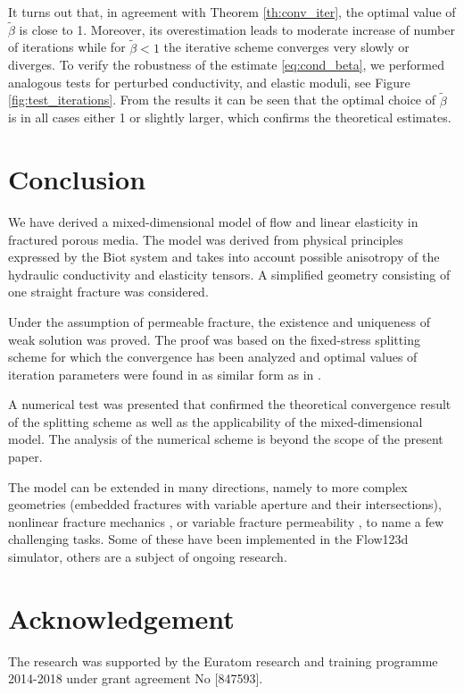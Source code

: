 \documentclass[a4paper]{article}
\numberwithin{equation}{section}
\begin{document}
It turns out that, in agreement with Theorem \ref{th:conv_iter}, the optimal value of $\tilde\beta$ is close to 1.
Moreover, its overestimation leads to moderate increase of number of iterations while for $\tilde\beta<1$ the iterative scheme converges very slowly or diverges.
To verify the robustness of the estimate \eqref{eq:cond_beta}, we performed analogous tests for perturbed conductivity, and elastic moduli, see Figure \ref{fig:test_iterations}.
From the results it can be seen that the optimal choice of $\tilde\beta$ is in all cases either 1 or slightly larger, which confirms the theoretical estimates.


\section*{Conclusion}
We have derived a mixed-dimensional model of flow and linear elasticity in fractured porous media.
The model was derived from physical principles expressed by the Biot system and takes into account possible anisotropy of the hydraulic conductivity and elasticity tensors.
A simplified geometry consisting of one straight fracture was considered.

Under the assumption of permeable fracture, the existence and uniqueness of weak solution was proved.
The proof was based on the fixed-stress splitting scheme for which the convergence has been analyzed and optimal values of iteration parameters were found in as similar form as in \cite{both2017robust}.

A numerical test was presented that confirmed the theoretical convergence result of the splitting scheme as well as the applicability of the mixed-dimensional model.
The analysis of the numerical scheme is beyond the scope of the present paper.

The model can be extended in many directions, namely to more complex geometries (embedded fractures with variable aperture and their intersections), nonlinear fracture mechanics \cite{berge2019finite}, or variable fracture permeability \cite{Watanabe2012lower}, to name a few challenging tasks.
Some of these have been implemented in the Flow123d simulator, others are a subject of ongoing research.


\section*{Acknowledgement}
The research was supported by the Euratom research and training programme 2014-2018 under grant agreement No [847593].
\end{document}
